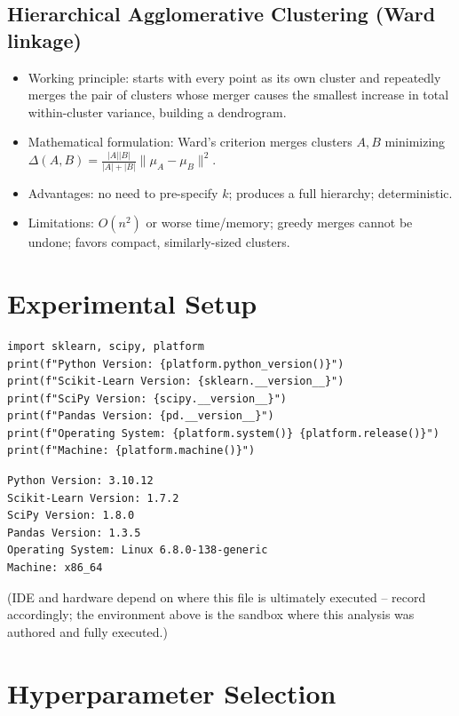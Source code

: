 \documentclass[12pt,a4paper]{article}
\begin{document}
\subsection{Hierarchical Agglomerative Clustering (Ward linkage)}
\label{sec:org101ed9b}
\begin{itemize}
\item Working principle: starts with every point as its own cluster and
repeatedly merges the pair of clusters whose merger causes the smallest
increase in total within-cluster variance, building a dendrogram.
\item Mathematical formulation: Ward's criterion merges clusters \(A, B\)
minimizing \(\Delta(A,B) = \frac{|A||B|}{|A|+|B|}\lVert \mu_A - \mu_B \rVert^2\).
\item Advantages: no need to pre-specify \(k\); produces a full hierarchy;
deterministic.
\item Limitations: \(O(n^2)\) or worse time/memory; greedy merges cannot be
undone; favors compact, similarly-sized clusters.
\end{itemize}

\section{Experimental Setup}
\label{sec:org4a22014}

\begin{verbatim}
import sklearn, scipy, platform
print(f"Python Version: {platform.python_version()}")
print(f"Scikit-Learn Version: {sklearn.__version__}")
print(f"SciPy Version: {scipy.__version__}")
print(f"Pandas Version: {pd.__version__}")
print(f"Operating System: {platform.system()} {platform.release()}")
print(f"Machine: {platform.machine()}")
\end{verbatim}

\begin{verbatim}
Python Version: 3.10.12
Scikit-Learn Version: 1.7.2
SciPy Version: 1.8.0
Pandas Version: 1.3.5
Operating System: Linux 6.8.0-138-generic
Machine: x86_64
\end{verbatim}


(IDE and hardware depend on where this file is ultimately executed --
record accordingly; the environment above is the sandbox where this
analysis was authored and fully executed.)

\section{Hyperparameter Selection}
\label{sec:orga245f90}
\end{document}
